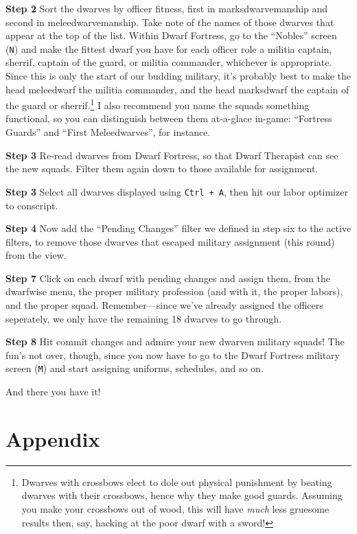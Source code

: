 \documentclass[]{article}
\newcommand{\step}[1] {
\vspace{12pt}
\noindent \textbf{Step #1}
}
\begin{document}
\step{2} Sort the dwarves by officer fitness, first in marksdwarvemanship and second in
meleedwarvemanship. Take note of the names of those dwarves that appear at the top of the list. Within
Dwarf Fortress, go to the ``Nobles'' screen (\texttt{N}) and make the fittest dwarf you have for each
officer role a militia captain, sherrif, captain of the guard, or militia commander, whichever is
appropriate. Since this is only the start of our budding military, it's probably best to make the head
meleedwarf the militia commander, and the head marksdwarf the captain of the guard or
sherrif.\footnote{Dwarves with crossbows elect to dole out physical punishment by beating dwarves with
their crossbows, hence why they make good guards. Assuming you make your crossbows out of wood, this
will have \emph{much} less gruesome results then, say, hacking at the poor dwarf with a sword!} I also
recommend you name the squads something functional, so you can distinguish between them at-a-glace
in-game: ``Fortress Guards'' and ``First Meleedwarves'', for instance.

\step{3} Re-read dwarves from Dwarf Fortress, so that Dwarf Therapist can see the new squads. Filter them
again down to those available for assignment.

\step{3} Select all dwarves displayed using \texttt{Ctrl + A}, then hit our labor optimizer to conscript.

\step{4} Now add the ``Pending Changes'' filter we defined in step six to the active filters, to remove
those dwarves that escaped military assignment (this round) from the view.

\step{7} Click on each dwarf with pending changes and assign them, from the dwarfwise menu, the proper
military profession (and with it, the proper labors), and the proper squad. Remember---since we've
already assigned the officers seperately, we only have the remaining 18 dwarves to go through.

\step{8} Hit commit changes and admire your new dwarven military squads! The fun's not over, though,
since you now have to go to the Dwarf Fortress military screen (\texttt{M}) and start assigning
uniforms, schedules, and so on.

\vspace{12pt}
And there you have it!

\newpage
\part{Appendix}
\end{document}
